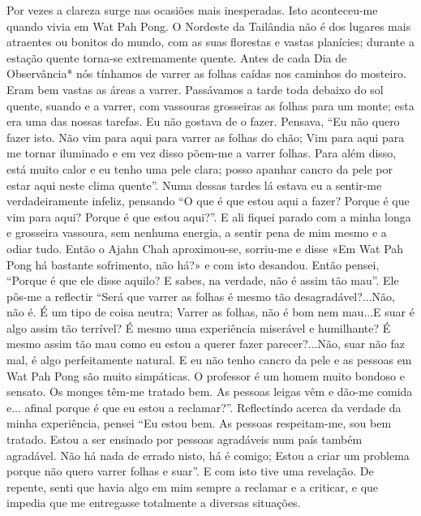 Por vezes a clareza surge nas ocasiões mais inesperadas.
Isto aconteceu-me quando vivia em Wat Pah Pong. O
Nordeste da Tailândia não é dos lugares mais atraentes ou
bonitos do mundo, com as suas florestas e vastas planícies;
durante a estação quente torna-se extremamente quente.
Antes de cada Dia de Observância* nós tínhamos de varrer as
folhas caídas nos caminhos do mosteiro. Eram bem vastas as
áreas a varrer. Passávamos a tarde toda debaixo do sol quente,
suando e a varrer, com vassouras grosseiras as folhas para um
monte; esta era uma das nossas tarefas. Eu não gostava de o
fazer. Pensava, “Eu não quero fazer isto. Não vim para aqui
para varrer as folhas do chão; Vim para aqui para me tornar
iluminado e em vez disso põem-me a varrer folhas. Para além
disso, está muito calor e eu tenho uma pele clara; posso apanhar
cancro da pele por estar aqui neste clima quente”.
Numa dessas tardes lá estava eu a sentir-me verdadeiramente infeliz, pensando “O que é que estou aqui a fazer?
Porque é que vim para aqui? Porque é que estou aqui?”. E ali
fiquei parado com a minha longa e grosseira vassoura, sem
nenhuma energia, a sentir pena de mim mesmo e a odiar tudo.
Então o Ajahn Chah aproximou-se, sorriu-me e disse «Em
Wat Pah Pong há bastante sofrimento, não há?» e com isto
desandou. Então pensei, “Porque é que ele disse aquilo? E
sabes, na verdade, não é assim tão mau”. Ele pôs-me a reflectir
“Será que varrer as folhas é mesmo tão desagradável?...Não,
não é. É um tipo de coisa neutra; Varrer as folhas, não é bom
nem mau...E suar é algo assim tão terrível? É mesmo uma
experiência miserável e humilhante? É mesmo assim tão mau
como eu estou a querer fazer parecer?...Não, suar não faz mal,
é algo perfeitamente natural. E eu não tenho cancro da pele e
as pessoas em Wat Pah Pong são muito simpáticas. O professor é um homem muito bondoso e sensato. Os monges
têm-me tratado bem. As pessoas leigas vêm e dão-me comida
e... afinal porque é que eu estou a reclamar?”. Reflectindo
acerca da verdade da minha experiência, pensei “Eu estou
bem. As pessoas respeitam-me, sou bem tratado. Estou a ser
ensinado por pessoas agradáveis num país também agradável.
Não há nada de errado nisto, há é comigo; Estou a criar um
problema porque não quero varrer folhas e suar”. E com isto
tive uma revelação. De repente, senti que havia algo em mim
sempre a reclamar e a criticar, e que impedia que me entregasse
totalmente a diversas situações.

